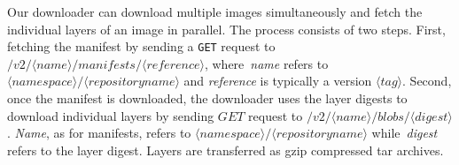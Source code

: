 Our downloader can download multiple images simultaneously and fetch
the individual layers of an image in parallel.
%
%
%
%
%
%
%
The process consists of two steps.
%
First, fetching the manifest by sending a \texttt{GET} request to
$/v2/\langle name \rangle/manifests/\langle reference \rangle$,
where~\textit{name} refers to
$\langle namespace\rangle/\langle repository name \rangle$
and \textit{reference} is typically a version $\langle tag \rangle$.
%
%
%
%
%
%
%
Second, once the manifest is downloaded, the downloader uses the layer digests to
download individual layers
by sending $GET$ request to $/v2/\langle name \rangle/blobs/\langle digest \rangle$.
\textit{Name}, as for manifests,
refers to $\langle namespace\rangle/\langle repository name \rangle$
while~\textit{digest} refers to the layer digest.
Layers are transferred as gzip compressed tar archives.

